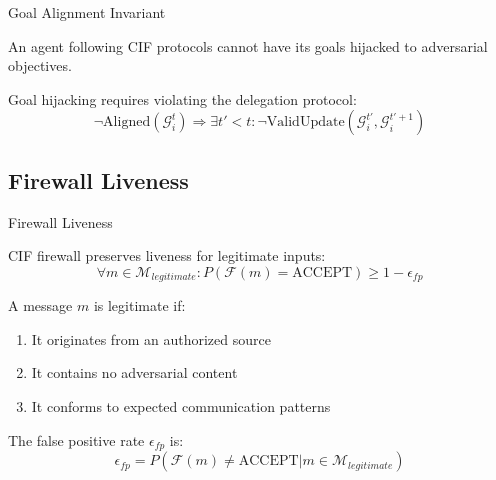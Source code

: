\documentclass[
  ignorenonframetext,
]{beamer}
\begin{document}
\begin{frame}[allowframebreaks]{Goal Alignment Invariant}
\begin{corollary}
\label{cor:safety-protocol}
An agent following CIF protocols cannot have its goals hijacked to adversarial objectives.
\end{corollary}

\begin{corollary}
\label{cor:hijack-necessary}
Goal hijacking requires violating the delegation protocol:
\begin{equation}
\label{eq:hijack-necessary}
\neg\text{Aligned}(\mathcal{G}_i^t) \Rightarrow \exists t' < t: \neg\text{ValidUpdate}(\mathcal{G}_i^{t'}, \mathcal{G}_i^{t'+1})
\end{equation}
\end{corollary}
\end{frame}

\begin{frame}
\end{frame}

\subsection{Firewall Liveness}\label{sec:thm59-proof}

\begin{frame}[allowframebreaks]{Firewall Liveness}
\begin{theorem}
\label{thm:firewall-liveness-restated}
CIF firewall preserves liveness for legitimate inputs:
\begin{equation}
\label{eq:firewall-liveness-restated}
\forall m \in \mathcal{M}_{legitimate}: P(\mathcal{F}(m) = \text{ACCEPT}) \geq 1 - \epsilon_{fp}
\end{equation}
\end{theorem}

\begin{definition}
\label{def:legitimate-message}
A message $m$ is legitimate if:
\begin{enumerate}
\item It originates from an authorized source
\item It contains no adversarial content
\item It conforms to expected communication patterns
\end{enumerate}
\end{definition}

\begin{definition}
\label{def:false-positive}
The false positive rate $\epsilon_{fp}$ is:
\begin{equation}
\label{eq:false-positive}
\epsilon_{fp} = P(\mathcal{F}(m) \neq \text{ACCEPT} | m \in \mathcal{M}_{legitimate})
\end{equation}
\end{definition}

\end{frame}
\end{document}
